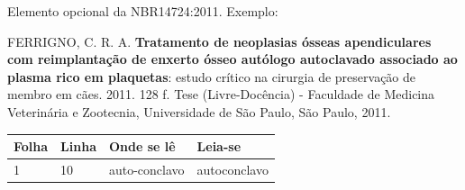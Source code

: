 \documentclass[
12pt,        %
openright,   %
twoside,     %
a4paper,     %
english,       %
brazil        %
%
%
]{ppgca}
\begin{document}
\begin{fichacatalografica}
        \sffamily
        \vspace*{\fill}					%
        \begin{center}					%
        \end{center}
      \end{fichacatalografica}
      \cleardoublepage

\begin{errata}
Elemento opcional da NBR14724:2011. Exemplo:

\vspace{\onelineskip}

FERRIGNO, C. R. A. \textbf{Tratamento de neoplasias ósseas apendiculares com
reimplantação de enxerto ósseo autólogo autoclavado associado ao plasma
rico em plaquetas}: estudo crítico na cirurgia de preservação de membro em
cães. 2011. 128 f. Tese (Livre-Docência) - Faculdade de Medicina Veterinária e
Zootecnia, Universidade de São Paulo, São Paulo, 2011.

\begin{table}[htb]
\center
\footnotesize
\begin{tabular}{|p{1.4cm}|p{1cm}|p{3cm}|p{3cm}|}
  \hline
   \textbf{Folha} & \textbf{Linha}  & \textbf{Onde se lê}  & \textbf{Leia-se}  \\
    \hline
    1 & 10 & auto-conclavo & autoconclavo\\
   \hline
\end{tabular}
\end{table}

\end{errata}
\end{document}
